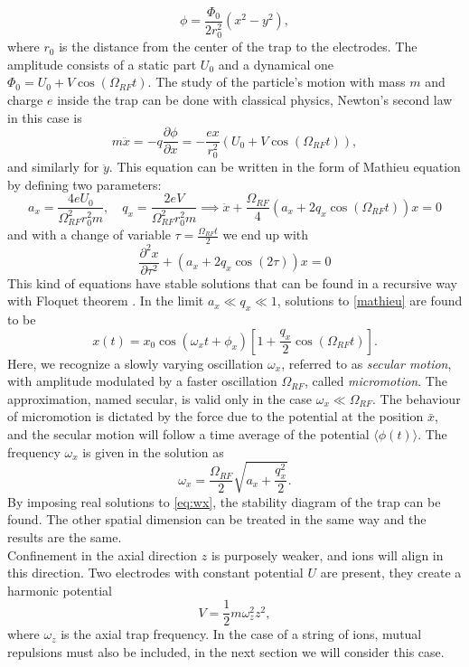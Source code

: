 \begin{equation}
\phi  = \frac{\Phi_0}{2r_0^2}\left(x^2 - y^2\right),
\end{equation}
where $r_0$ is the distance from the center of the trap to the electrodes. The amplitude consists of a static part $U_0$ and a dynamical one $\Phi_0 = U_0 + V \cos(\Omega_{RF} t)$.
The study of the particle's motion with mass $m$ and charge $e$ inside the trap can be done with classical physics, Newton's second law in this case is
\begin{equation}
m\ddot{x} = -q \frac{\partial \phi}{\partial x} = - \frac{ex}{r_0^2}\left(U_0 + V \cos(\Omega_{RF} t) \right),
\end{equation}
and similarly for $\ddot{y}$. This equation can be written in the form of Mathieu equation \cite{Richards1983} by defining two parameters:
\begin{equation}
a_x = \frac{4eU_0}{\Omega_{RF}^2r_0^2m}, \quad q_x = \frac{2eV}{\Omega_{RF}^2r_0^2m} \implies \ddot{x} +\frac{\Omega_{RF}}{4} \left(a_x + 2q_x \cos(\Omega_{RF} t )\right)x = 0
\end{equation}
and with a change of variable $\tau = \frac{\Omega_{RF} t}{2}$ we end up with
\begin{equation}
\label{mathieu}
\frac{\partial^2 x}{\partial \tau^2}+\left(a_x + 2q_x \cos(2\tau)\right)x = 0
\end{equation}
This kind of equations have stable solutions that can be found in a recursive way with Floquet theorem \cite{iondynamic}. In the limit $a_x \ll q_x \ll 1$, solutions to \eqref{mathieu} are found to be
\begin{equation}
x(t) = x_0 \cos(\omega_x t +\phi_x)\left[1 + \frac{q_x}{2}\cos(\Omega_{RF} t) \right].
\end{equation}
Here, we recognize a slowly varying oscillation $\omega_x$, referred to as \emph{secular motion}, with amplitude modulated by a faster oscillation $\Omega_{RF}$, called \emph{micromotion}. The approximation, named secular, is valid only in the case $\omega_x \ll \Omega_{RF}$. The behaviour of micromotion is dictated by the force due to the potential at the position $\bar{x}$, and the secular motion will follow a time average of the potential $\langle \phi(t) \rangle$. The frequency $\omega_x$ is given in the solution as
\begin{equation}
\label{eq:wx}
\omega_x = \frac{\Omega_{RF}}{2}\sqrt{a_x + \frac{q_x^2}{2}}.
\end{equation}
By imposing real solutions to \eqref{eq:wx}, the stability diagram of the trap can be found. The other spatial dimension can be treated in the same way and the results are the same.\\
Confinement in the axial direction $z$ is purposely weaker, and ions will align in this direction. Two electrodes with constant potential $U$ are present, they create a harmonic potential
\begin{equation}
V = \frac{1}{2}m\omega_z^2z^2,
\end{equation}
where $\omega_z$ is the axial trap frequency. In the case of a string of ions, mutual repulsions must also be included, in the next section we will consider this case.


